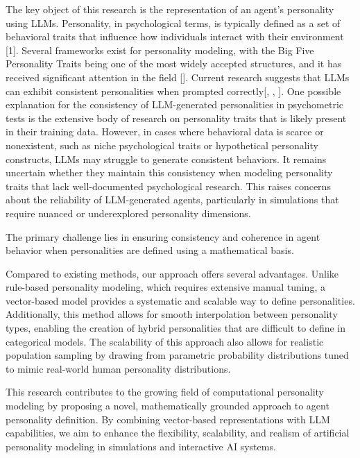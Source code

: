 \documentclass{article}
\begin{document}
The key object of this research is the representation of an agent’s personality using LLMs. Personality, in psychological terms, is typically defined as a set of behavioral traits that influence how individuals interact with their environment [1]. Several frameworks exist for personality modeling, with the Big Five Personality Traits being one of the most widely accepted structures, and it has received significant attention in the field [\cite{john1999bigfive}]. Current research suggests that LLMs can exhibit consistent personalities when prompted correctly[\cite{serapiogarcía2023personalitytraitslargelanguage}, \cite{frisch2024llmagentsinteractionmeasuring}, \cite{klinkert2024drivinggenerativeagentspersonality}]. One possible explanation for the consistency of LLM-generated personalities in psychometric tests is the extensive body of research on personality traits that is likely present in their training data. However, in cases where behavioral data is scarce or nonexistent, such as niche psychological traits or hypothetical personality constructs, LLMs may struggle to generate consistent behaviors. It remains uncertain whether they maintain this consistency when modeling personality traits that lack well-documented psychological research. This raises concerns about the reliability of LLM-generated agents, particularly in simulations that require nuanced or underexplored personality dimensions.

The primary challenge lies in ensuring consistency and coherence in agent behavior when personalities are defined using a mathematical basis. 

Compared to existing methods, our approach offers several advantages. Unlike rule-based personality modeling, which requires extensive manual tuning, a vector-based model provides a systematic and scalable way to define personalities. Additionally, this method allows for smooth interpolation between personality types, enabling the creation of hybrid personalities that are difficult to define in categorical models. The scalability of this approach also allows for realistic population sampling by drawing from parametric probability distributions tuned to mimic real-world human personality distributions.

This research contributes to the growing field of computational personality modeling by proposing a novel, mathematically grounded approach to agent personality definition. By combining vector-based representations with LLM capabilities, we aim to enhance the flexibility, scalability, and realism of artificial personality modeling in simulations and interactive AI systems.


\printbibliography
    
\end{document}
